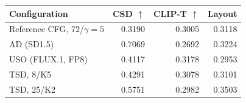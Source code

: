 \begin{tabular}{lrrr}
\toprule
Configuration & CSD $\uparrow$ & CLIP-T $\uparrow$ & Layout \\
\midrule
Reference CFG, 72/$\gamma=5$ & 0.3190 & 0.3005 & 0.3118 \\
AD (SD1.5) & 0.7069 & 0.2692 & 0.3224 \\
USO (FLUX.1, FP8) & 0.4117 & 0.3178 & 0.2953 \\
TSD, 8/K5 & 0.4291 & 0.3078 & 0.3101 \\
TSD, 25/K2 & 0.5751 & 0.2982 & 0.3503 \\
\bottomrule
\end{tabular}
